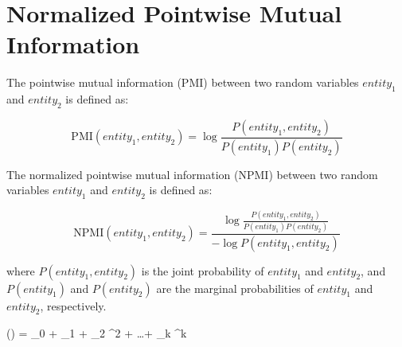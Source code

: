 \documentclass{article}
\begin{document}
\section*{Normalized Pointwise Mutual Information}

The pointwise mutual information (PMI) between two random variables \(entity_1\) and \(entity_2\) is defined as:

\begin{equation}
\text{PMI}(entity_1, entity_2) = \log \frac{P(entity_1, entity_2)}{P(entity_1) P(entity_2)}
\end{equation}

The normalized pointwise mutual information (NPMI) between two random variables \(entity_1\) and \(entity_2\) is defined as:

\begin{equation}
\text{NPMI}(entity_1, entity_2) = \frac{\log \frac{P(entity_1, entity_2)}{P(entity_1) P(entity_2)}}{-\log P(entity_1, entity_2)}
\end{equation}

where \(P(entity_1, entity_2)\) is the joint probability of \(entity_1\) and \(entity_2\), and \(P(entity_1)\) and \(P(entity_2)\) are the marginal probabilities of \(entity_1\) and \(entity_2\), respectively.


\log\left(\right) = \beta_0 + \beta_1 \cdot {} + \beta_2 \cdot {}^2 + \dots + \beta_k \cdot {}^k
\end{document}
